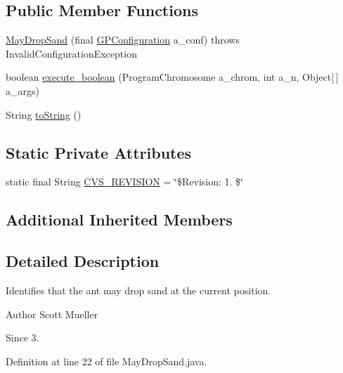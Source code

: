 \subsection*{Public Member Functions}
\begin{DoxyCompactItemize}
\item 
\hyperlink{classexamples_1_1gp_1_1painted_desert_1_1_may_drop_sand_a95cacb517df91944cd934a2238e53b14}{May\-Drop\-Sand} (final \hyperlink{classorg_1_1jgap_1_1gp_1_1impl_1_1_g_p_configuration}{G\-P\-Configuration} a\-\_\-conf)  throws Invalid\-Configuration\-Exception 
\item 
boolean \hyperlink{classexamples_1_1gp_1_1painted_desert_1_1_may_drop_sand_a463f32d260b660437b7990ab5f574737}{execute\-\_\-boolean} (Program\-Chromosome a\-\_\-chrom, int a\-\_\-n, Object\mbox{[}$\,$\mbox{]} a\-\_\-args)
\item 
String \hyperlink{classexamples_1_1gp_1_1painted_desert_1_1_may_drop_sand_a0b2f7966e746ec496fef95fab0b5919d}{to\-String} ()
\end{DoxyCompactItemize}
\subsection*{Static Private Attributes}
\begin{DoxyCompactItemize}
\item 
static final String \hyperlink{classexamples_1_1gp_1_1painted_desert_1_1_may_drop_sand_af4f62395f626129c829758692a702f0e}{C\-V\-S\-\_\-\-R\-E\-V\-I\-S\-I\-O\-N} = \char`\"{}\$Revision\-: 1. \$\char`\"{}
\end{DoxyCompactItemize}
\subsection*{Additional Inherited Members}


\subsection{Detailed Description}
Identifies that the ant may drop sand at the current position.

\begin{DoxyAuthor}{Author}
Scott Mueller 
\end{DoxyAuthor}
\begin{DoxySince}{Since}
3. 
\end{DoxySince}


Definition at line 22 of file May\-Drop\-Sand.\-java.



